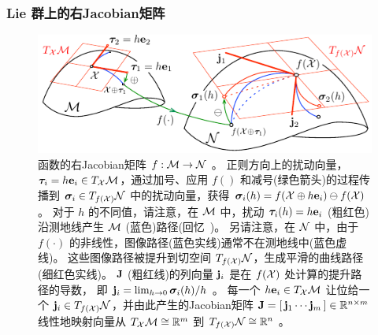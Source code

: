\subsubsection{Lie 群上的右Jacobian矩阵}


\begin{figure}[tb]
\centering
\includegraphics{figures/jacobian}
\caption{函数的右Jacobian矩阵 $f:\mathcal{M}\to\mathcal{N}$ 。
正则方向上的扰动向量， ${\bm \tau}_i=h{\bf e}_i\in T_{\mathcal{X}}{\mathcal{M}}$，通过加号、应用 $f()$ 和减号(绿色箭头)的过程传播到 ${\bm \sigma}_i\in T_{f(\mathcal{X})}{\mathcal{N}}$ 中的扰动向量，获得 ${\bm \sigma}_i(h)=f(\mathcal{X}\oplus h{\bf e}_i)\ominus f(\mathcal{X})$。 
对于 $h$ 的不同值，请注意，在 $\mathcal{M}$ 中，扰动 ${\bm \tau}_i(h)=h{\bf e}_i$ (粗红色)沿测地线产生 $\mathcal{M}$ (蓝色)路径(回忆~)。
另请注意，在 $\mathcal{N}$ 中，由于 $f(\cdot)$ 的非线性，图像路径(蓝色实线)通常不在测地线中(蓝色虚线)。
这些图像路径被提升到切空间 $T_{f(\mathcal{X})}{\mathcal{N}}$，生成平滑的曲线路径(细红色实线)。
${\bf J}$ (粗红线)的列向量 ${\bf j}_i$ 是在 $f(\mathcal{X})$ 处计算的提升路径的导数，
即 ${\bf j}_i=\lim_{h\to0}{\bm \sigma}_i(h)/h$ 。
每一个 $h{\bf e}_i\in T_{\mathcal{X}}{\mathcal{M}}$ 让位给一个 ${\bf j}_i\in T_{f(\mathcal{X})}{\mathcal{N}}$，并由此产生的Jacobian矩阵 ${\bf J}=[\,{\bf j}_1\cdots{\bf j}_m\,]\in{\mathbb R}^{n\times m}$ 线性地映射向量从 $T_{\mathcal{X}}{\mathcal{M}}\cong{\mathbb R}^m$ 到 $T_{f(\mathcal{X})}{\mathcal{N}}\cong{\mathbb R}^n$ 。
}
\label{fig:manifold_g}
\end{figure}
%


